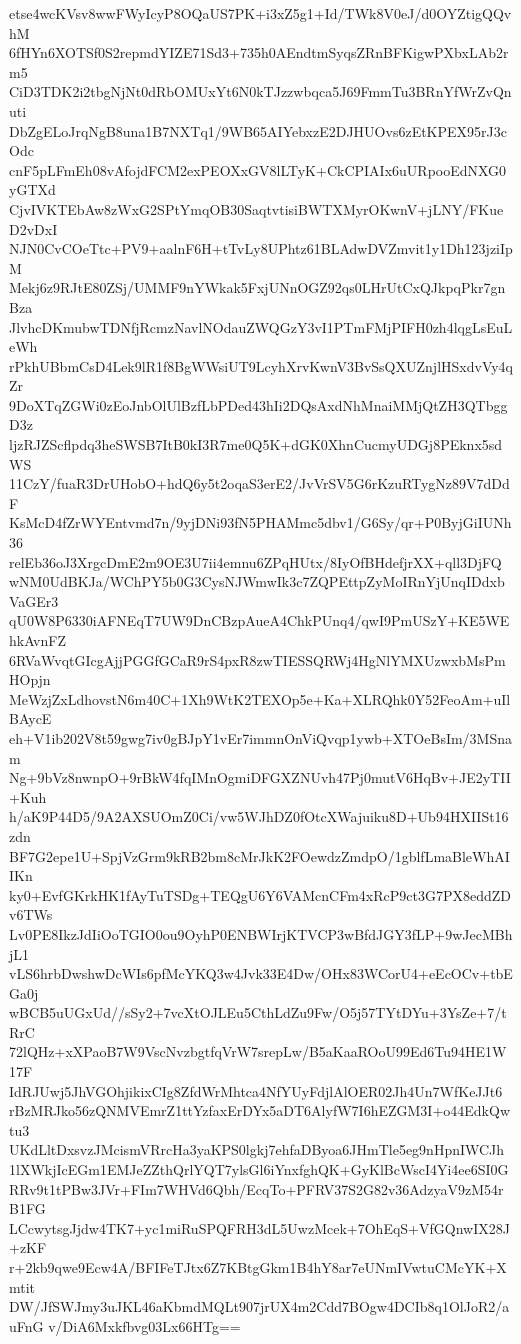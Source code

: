 etse4wcKVsv8wwFWyIcyP8OQaUS7PK+i3xZ5g1+Id/TWk8V0eJ/d0OYZtigQQvhM
6fHYn6XOTSf0S2repmdYIZE71Sd3+735h0AEndtmSyqsZRnBFKigwPXbxLAb2rm5
CiD3TDK2i2tbgNjNt0dRbOMUxYt6N0kTJzzwbqca5J69FmmTu3BRnYfWrZvQnuti
DbZgELoJrqNgB8una1B7NXTq1/9WB65AIYebxzE2DJHUOvs6zEtKPEX95rJ3cOdc
cnF5pLFmEh08vAfojdFCM2exPEOXxGV8lLTyK+CkCPIAIx6uURpooEdNXG0yGTXd
CjvIVKTEbAw8zWxG2SPtYmqOB30SaqtvtisiBWTXMyrOKwnV+jLNY/FKueD2vDxI
NJN0CvCOeTtc+PV9+aalnF6H+tTvLy8UPhtz61BLAdwDVZmvit1y1Dh123jziIpM
Mekj6z9RJtE80ZSj/UMMF9nYWkak5FxjUNnOGZ92qs0LHrUtCxQJkpqPkr7gnBza
JlvhcDKmubwTDNfjRcmzNavlNOdauZWQGzY3vI1PTmFMjPIFH0zh4lqgLsEuLeWh
rPkhUBbmCsD4Lek9lR1f8BgWWsiUT9LcyhXrvKwnV3BvSsQXUZnjlHSxdvVy4qZr
9DoXTqZGWi0zEoJnbOlUlBzfLbPDed43hIi2DQsAxdNhMnaiMMjQtZH3QTbggD3z
ljzRJZScflpdq3heSWSB7ItB0kI3R7me0Q5K+dGK0XhnCucmyUDGj8PEknx5sdWS
11CzY/fuaR3DrUHobO+hdQ6y5t2oqaS3erE2/JvVrSV5G6rKzuRTygNz89V7dDdF
KsMcD4fZrWYEntvmd7n/9yjDNi93fN5PHAMmc5dbv1/G6Sy/qr+P0ByjGiIUNh36
relEb36oJ3XrgcDmE2m9OE3U7ii4emnu6ZPqHUtx/8IyOfBHdefjrXX+qll3DjFQ
wNM0UdBKJa/WChPY5b0G3CysNJWmwIk3c7ZQPEttpZyMoIRnYjUnqIDdxbVaGEr3
qU0W8P6330iAFNEqT7UW9DnCBzpAueA4ChkPUnq4/qwI9PmUSzY+KE5WEhkAvnFZ
6RVaWvqtGIcgAjjPGGfGCaR9rS4pxR8zwTIESSQRWj4HgNlYMXUzwxbMsPmHOpjn
MeWzjZxLdhovstN6m40C+1Xh9WtK2TEXOp5e+Ka+XLRQhk0Y52FeoAm+uIlBAycE
eh+V1ib202V8t59gwg7iv0gBJpY1vEr7immnOnViQvqp1ywb+XTOeBsIm/3MSnam
Ng+9bVz8nwnpO+9rBkW4fqIMnOgmiDFGXZNUvh47Pj0mutV6HqBv+JE2yTII+Kuh
h/aK9P44D5/9A2AXSUOmZ0Ci/vw5WJhDZ0fOtcXWajuiku8D+Ub94HXIISt16zdn
BF7G2epe1U+SpjVzGrm9kRB2bm8cMrJkK2FOewdzZmdpO/1gblfLmaBleWhAIIKn
ky0+EvfGKrkHK1fAyTuTSDg+TEQgU6Y6VAMcnCFm4xRcP9ct3G7PX8eddZDv6TWs
Lv0PE8IkzJdIiOoTGIO0ou9OyhP0ENBWIrjKTVCP3wBfdJGY3fLP+9wJecMBhjL1
vLS6hrbDwshwDcWIs6pfMcYKQ3w4Jvk33E4Dw/OHx83WCorU4+eEcOCv+tbEGa0j
wBCB5uUGxUd//sSy2+7vcXtOJLEu5CthLdZu9Fw/O5j57TYtDYu+3YsZe+7/tRrC
72lQHz+xXPaoB7W9VscNvzbgtfqVrW7srepLw/B5aKaaROoU99Ed6Tu94HE1W17F
IdRJUwj5JhVGOhjikixCIg8ZfdWrMhtca4NfYUyFdjlAlOER02Jh4Un7WfKeJJt6
rBzMRJko56zQNMVEmrZ1ttYzfaxErDYx5aDT6AlyfW7I6hEZGM3I+o44EdkQwtu3
UKdLltDxsvzJMcismVRrcHa3yaKPS0lgkj7ehfaDByoa6JHmTle5eg9nHpnIWCJh
1lXWkjIcEGm1EMJeZZthQrlYQT7ylsGl6iYnxfghQK+GyKlBcWscI4Yi4ee6SI0G
RRv9t1tPBw3JVr+FIm7WHVd6Qbh/EcqTo+PFRV37S2G82v36AdzyaV9zM54rB1FG
LCcwytsgJjdw4TK7+yc1miRuSPQFRH3dL5UwzMcek+7OhEqS+VfGQnwIX28J+zKF
r+2kb9qwe9Ecw4A/BFIFeTJtx6Z7KBtgGkm1B4hY8ar7eUNmIVwtuCMcYK+Xmtit
DW/JfSWJmy3uJKL46aKbmdMQLt907jrUX4m2Cdd7BOgw4DCIb8q1OlJoR2/auFnG
v/DiA6Mxkfbvg03Lx66HTg==
